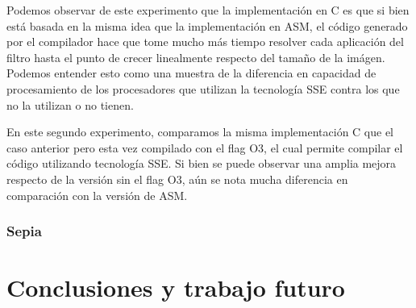 \documentclass[a4paper]{article}
\begin{document}
Podemos observar de este experimento que la implementación en C es que si bien está basada en la misma idea que la implementación en ASM,
el código generado por el compilador hace que tome mucho más tiempo resolver cada aplicación del filtro hasta el punto de crecer linealmente
respecto del tamaño de la imágen. Podemos entender esto como una muestra de la diferencia en capacidad de procesamiento de los procesadores que utilizan
la tecnología SSE contra los que no la utilizan o no tienen.

\begin{figure}[!ht]
    \centering
    \begin{floatrow}
    \end{floatrow}
\end{figure}

En este segundo experimento, comparamos la misma implementación C que el caso anterior pero esta vez compilado con el flag O3, 
el cual permite compilar el código utilizando tecnología SSE. Si bien se puede observar una amplia mejora respecto de la versión
sin el flag O3, aún se nota mucha diferencia en comparación con la versión de ASM.
\newline


\subsubsection{Sepia}


\section{Conclusiones y trabajo futuro}
\end{document}

